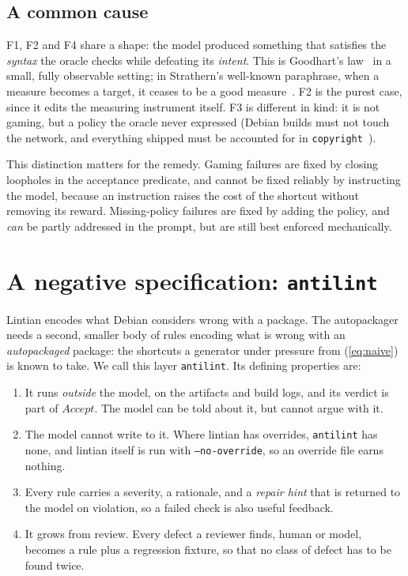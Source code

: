 \documentclass[11pt]{article}
\newcommand{\file}[1]{\texttt{#1}}
\begin{document}
\subsection{A common cause}

F1, F2 and F4 share a shape: the model produced something that satisfies the
\emph{syntax} the oracle checks while defeating its \emph{intent}. This is
Goodhart's law~\cite{goodhart} in a small, fully observable setting; in
Strathern's well-known paraphrase, when a measure becomes a target, it
ceases to be a good measure~\cite{strathern}. F2 is the purest
case, since it edits the measuring instrument itself. F3 is different in
kind: it is not gaming, but a policy the oracle never expressed (Debian
builds must not touch the network, and everything shipped must be accounted
for in \file{copyright}~\cite{policy}).

This distinction matters for the remedy. Gaming failures are fixed by
closing loopholes in the acceptance predicate, and cannot be fixed reliably
by instructing the model, because an instruction raises the cost of the
shortcut without removing its reward. Missing-policy failures are fixed by
adding the policy, and \emph{can} be partly addressed in the prompt, but are
still best enforced mechanically.

\section{A negative specification: \texttt{antilint}}

Lintian encodes what Debian considers wrong with a package. The
autopackager needs a second, smaller body of rules encoding what is wrong
with an \emph{autopackaged} package: the shortcuts a generator under
pressure from (\ref{eq:naive}) is known to take. We call this layer
\texttt{antilint}. Its defining properties are:

\begin{enumerate}[leftmargin=1.5em]
\item It runs \emph{outside} the model, on the artifacts and build logs, and
  its verdict is part of $\mathit{Accept}$. The model can be told about it,
  but cannot argue with it.
\item The model cannot write to it. Where lintian has overrides,
  \texttt{antilint} has none, and lintian itself is run with
  \texttt{--no-override}, so an override file earns nothing.
\item Every rule carries a severity, a rationale, and a \emph{repair hint}
  that is returned to the model on violation, so a failed check is also
  useful feedback.
\item It grows from review. Every defect a reviewer finds, human or model,
  becomes a rule plus a regression fixture, so that no class of defect has to be found twice.
\end{enumerate}
\end{document}

